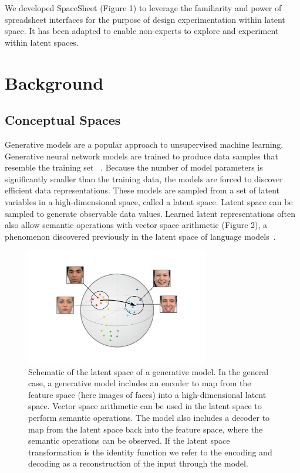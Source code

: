 \documentclass[letterpaper]{article}
\begin{document}
We developed SpaceSheet (Figure 1) to leverage the familiarity and power of spreadsheet interfaces for the purpose of design experimentation within latent space. It has been adapted to enable non-experts to explore and experiment within latent spaces.

\section{Background}

\subsection{Conceptual Spaces}

Generative models are a popular approach to unsupervised machine learning. Generative neural network models are trained to produce data samples that resemble the training set ~\cite{openai1}. Because the number of model parameters is significantly smaller than the training data, the models are forced to discover efficient data representations. These models are sampled from a set of latent variables in a high-dimensional space, called a latent space. Latent space can be sampled to generate observable data values. Learned latent representations often also allow semantic operations with vector space arithmetic (Figure 2), a phenomenon discovered previously in the latent space of language models~\cite{word2vec}.

\begin{figure}[ht]
  \centering
  \includegraphics[width=8cm]{figs/face_space.png}
  \caption{Schematic of the latent space of a generative model. In the general case, a generative model includes an encoder to map from the feature space (here images of faces) into a high-dimensional latent space. Vector space arithmetic can be used in the latent space to perform semantic operations. The model also includes a decoder to map from the latent space back into the feature space, where the semantic operations can be observed. If the latent space transformation is the identity function we refer to the encoding and decoding as a reconstruction of the input through the model. }
\end{figure}
\end{document}
